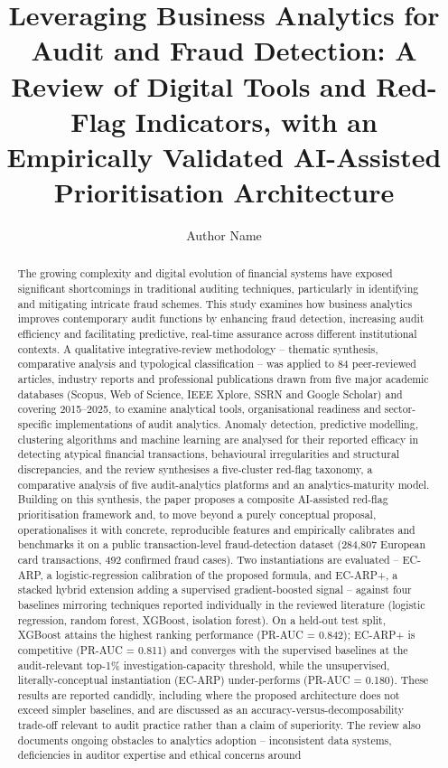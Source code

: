 \documentclass[preprint,12pt]{elsarticle}
\begin{document}
\begin{frontmatter}

\title{Leveraging Business Analytics for Audit and Fraud Detection: A Review of Digital Tools and Red-Flag Indicators, with an Empirically Validated AI-Assisted Prioritisation Architecture}

\author[1]{Author Name}
\address[1]{Department, Institution, City, Country}

\begin{abstract}
The growing complexity and digital evolution of financial systems have exposed significant shortcomings in traditional auditing techniques, particularly in identifying and mitigating intricate fraud schemes. This study examines how business analytics improves contemporary audit functions by enhancing fraud detection, increasing audit efficiency and facilitating predictive, real-time assurance across different institutional contexts. A qualitative integrative-review methodology -- thematic synthesis, comparative analysis and typological classification -- was applied to 84 peer-reviewed articles, industry reports and professional publications drawn from five major academic databases (Scopus, Web of Science, IEEE Xplore, SSRN and Google Scholar) and covering 2015--2025, to examine analytical tools, organisational readiness and sector-specific implementations of audit analytics. Anomaly detection, predictive modelling, clustering algorithms and machine learning are analysed for their reported efficacy in detecting atypical financial transactions, behavioural irregularities and structural discrepancies, and the review synthesises a five-cluster red-flag taxonomy, a comparative analysis of five audit-analytics platforms and an analytics-maturity model. Building on this synthesis, the paper proposes a composite AI-assisted red-flag prioritisation framework and, to move beyond a purely conceptual proposal, operationalises it with concrete, reproducible features and empirically calibrates and benchmarks it on a public transaction-level fraud-detection dataset (284,807 European card transactions, 492 confirmed fraud cases). Two instantiations are evaluated -- EC-ARP, a logistic-regression calibration of the proposed formula, and EC-ARP+, a stacked hybrid extension adding a supervised gradient-boosted signal -- against four baselines mirroring techniques reported individually in the reviewed literature (logistic regression, random forest, XGBoost, isolation forest). On a held-out test split, XGBoost attains the highest ranking performance (PR-AUC = 0.842); EC-ARP+ is competitive (PR-AUC = 0.811) and converges with the supervised baselines at the audit-relevant top-1\% investigation-capacity threshold, while the unsupervised, literally-conceptual instantiation (EC-ARP) under-performs (PR-AUC = 0.180). These results are reported candidly, including where the proposed architecture does not exceed simpler baselines, and are discussed as an accuracy-versus-decomposability trade-off relevant to audit practice rather than a claim of superiority. The review also documents ongoing obstacles to analytics adoption -- inconsistent data systems, deficiencies in auditor expertise and ethical concerns around 
\end{abstract}
\end{frontmatter}
\end{document}
